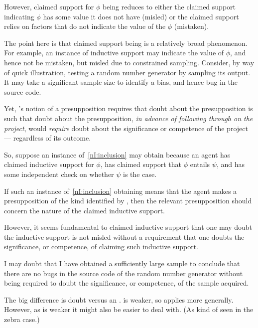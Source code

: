 \begin{note}
  However, claimed support for \(\phi\) being \mom{} reduces to either the claimed support indicating \(\phi\) has some value it does not have (misled) or the claimed support relies on factors that do not indicate the value of the \(\phi\) (mistaken).

  The point here is that claimed support being \mom{} is a relatively broad phenomenon.
  For example, an instance of inductive support may indicate the value of \(\phi\), and hence not be mistaken, but misled due to constrained sampling.
  Consider, by way of quick illustration, testing a random number generator by sampling its output.
  It may take a significant sample size to identify a bias, and hence bug in the source code.

  Yet, \citeauthor{Wright:2011wn}'s notion of a presupposition requires that doubt about the presupposition is such that doubt about the presupposition, \emph{in advance of following through on the project}, would \emph{require} doubt about the significance or competence of the project --- regardless of its outcome.

  So, suppose an instance of~\ref{nI:inclusion} may obtain because an agent has claimed inductive support for \(\phi\), has claimed support that \(\phi\) entails \(\psi\), and has some independent check on whether \(\psi\) is the case.

  If such an instance of~\ref{nI:inclusion} obtaining means that the agent makes a presupposition of the kind identified by \wrt{}, then the relevant presupposition should concern the nature of the claimed inductive support.

  However, it seems fundamental to claimed inductive support that one may doubt the inductive support is not misled without a requirement that one doubts the significance, or competence, of claiming such inductive support.

  I may doubt that I have obtained a sufficiently large sample to conclude that there are no bugs in the source code of the random number generator without being required to doubt the significance, or competence, of the sample acquired.
\end{note}

\begin{note}
  \color{red}
  The big difference is doubt versus an \expec{}.
   is weaker, so applies more generally.
  However, as \expec{} is weaker it might also be easier to deal with.
  (As kind of seen in the zebra case.)
\end{note}

